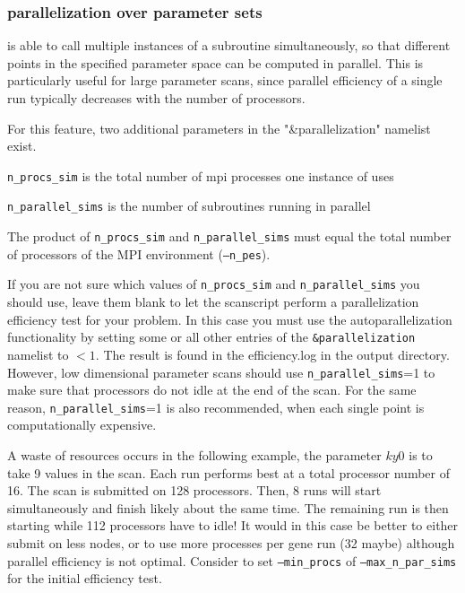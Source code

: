 \documentclass[12pt]{article}
\begin{document}
\subsubsection{\gene parallelization over parameter sets}

\label{sec:scangene}
\gene is able to call multiple instances of a \gene subroutine
simultaneously, so that different points in the specified parameter space can be
computed in parallel. This is particularly useful for large parameter
scans, since parallel efficiency of a single \gene run typically
decreases with the number of processors.

For this feature, two additional parameters in the "\&parallelization"
namelist exist.

\texttt{n\_procs\_sim} is the total number of mpi processes one
instance of \gene uses

\texttt{n\_parallel\_sims} is the number of \gene subroutines running in
parallel

The product of \texttt{n\_procs\_sim} and
\texttt{n\_parallel\_sims} must equal the total number of processors of
the MPI environment (\texttt{--n\_pes}).

If you are not sure which values of \texttt{n\_procs\_sim} and
\texttt{n\_parallel\_sims} you should use, leave them blank to let the
scanscript perform a parallelization efficiency test for your problem.
In this case you must use the autoparallelization functionality by
setting some or all other entries of the \texttt{\&parallelization} namelist to $<1$.
The result is found in the efficiency.log in the output directory.
However, low dimensional parameter scans should use
\texttt{n\_parallel\_sims}=1 to make sure that processors do not idle at
the end of the scan. For the same reason, \texttt{n\_parallel\_sims}=1
is also recommended, when each single point is computationally
expensive.

A waste of resources occurs in the following example, the parameter $ky0$ is to take 9 values in the scan.
Each run performs best at a total processor number of 16. The scan is submitted on 128 processors.
Then, 8 runs will start simultaneously and finish likely about the same time.
The remaining run is then starting while 112 processors have to idle!
It would in this case be better to either submit on less nodes, or to use more processes per gene run (32 maybe)
although parallel efficiency is not optimal.
Consider to set  \texttt{--min\_procs} of \texttt{--max\_n\_par\_sims} for the initial efficiency test.
\end{document}
